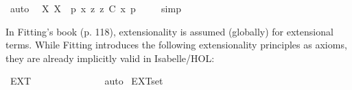 \begin{isabellebody}
\ auto\ %
%
\endisatagproof
{\isafoldproof}%
%
\isadelimproof
\isanewline
%
\endisadelimproof
{}\isamarkupfalse%
\ {\isachardoublequoteopen}{\isasymlfloor}{\isacharparenleft}{\isacharparenleft}{\isasymlambda}X{\isachardot}\ \isactrlbold {\isasymbox}{\isacharparenleft}X\ \ {\isacharparenleft}p{\isacharcolon}{\isacharcolon}{\isasymup}{\isasymzero}{\isacharparenright}{\isacharparenright}{\isacharparenright}\ \isactrlbold {\isasymdown}{\isacharparenleft}{\isasymlambda}x{\isachardot}\ \isactrlbold {\isasymdiamond}{\isacharparenleft}{\isasymlambda}z{\isachardot}\ z\ \isactrlbold {\isasymapprox}\isactrlsup C\ x{\isacharparenright}\ p{\isacharparenright}{\isacharparenright}{\isasymrfloor}{\isachardoublequoteclose}\ \isanewline
%
\isadelimproof
\ \ %
\endisadelimproof
%
\isatagproof
{}\isamarkupfalse%
\ simp\ \ %
%
\endisatagproof
{\isafoldproof}%
%
\isadelimproof
%
\endisadelimproof
%
\isamarkuptrue%
%
\begin{isamarkuptext}%
In Fitting's book (p. 118), extensionality is assumed (globally) for extensional terms. While Fitting introduces 
the following extensionality principles as axioms, they are already implicitly valid in Isabelle/HOL:%
\end{isamarkuptext}\isamarkuptrue%
\isamarkupfalse%
\ EXT{\isacharcolon}\ {\isachardoublequoteopen}{\isasymforall}{\isasymalpha}{\isacharcolon}{\isacharcolon}{\isasymlangle}{\isasymzero}{\isasymrangle}{\isachardot}\ {\isasymforall}{\isasymbeta}{\isacharcolon}{\isacharcolon}{\isasymlangle}{\isasymzero}{\isasymrangle}{\isachardot}\ {\isacharparenleft}{\isasymforall}{\isasymgamma}{\isacharcolon}{\isacharcolon}{\isasymzero}{\isachardot}\ {\isacharparenleft}{\isasymalpha}\ {\isasymgamma}\ {\isasymlongleftrightarrow}\ {\isasymbeta}\ {\isasymgamma}{\isacharparenright}{\isacharparenright}\ {\isasymlongrightarrow}\ {\isacharparenleft}{\isasymalpha}\ {\isacharequal}\ {\isasymbeta}{\isacharparenright}{\isachardoublequoteclose}%
\isadelimproof
\ %
\endisadelimproof
%
\isatagproof
{}\isamarkupfalse%
\ auto%
\endisatagproof
{\isafoldproof}%
%
\isadelimproof
%
\endisadelimproof
\isanewline
{}\isamarkupfalse%
\ EXT{\isacharunderscore}set{\isacharcolon}\ {\isachardoublequoteopen}{\isasymforall}{\isasymalpha}{\isacharcolon}{\isacharcolon}{\isasymlangle}{\isasymlangle}{\isasymzero}{\isasymrangle}{\isasymrangle}{\isachardot}\ {\isasymforall}{\isasymbeta}{\isacharcolon}{\isacharcolon}{\isasymlangle}{\isasymlangle}{\isasymzero}{\isasymrangle}{\isasymrangle}{\isachardot}\ {\isacharparenleft}{\isasymforall}{\isasymgamma}{\isacharcolon}{\isacharcolon}{\isasymlangle}{\isasymzero}{\isasymrangle}{\isachardot}\ {\isacharparenleft}{\isasymalpha}\ {\isasymgamma}\ {\isasymlongleftrightarrow}\ {\isasymbeta}\ {\isasymgamma}{\isacharparenright}{\isacharparenright}\ {\isasymlongrightarrow}\ {\isacharparenleft}{\isasymalpha}\ {\isacharequal}\ {\isasymbeta}{\isacharparenright}{\isachardoublequoteclose}\ \isanewline

\end{isabellebody}
